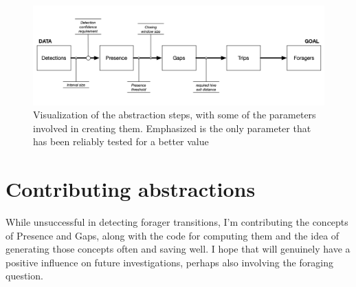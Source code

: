 \begin{figure}[htbp!] 
\centering    
\includegraphics[width=1.0\textwidth]{funnel-params}
\caption[funnel-params]{Visualization of the abstraction steps, with some of the parameters involved in creating them. Emphasized is the only parameter that has been reliably tested for a better value}
\label{fig:funnel-params}
\end{figure}




\section{Contributing abstractions}

While unsuccessful in detecting forager transitions, I'm contributing the concepts of Presence and Gaps, along with the code for computing them and the idea of generating those concepts often and saving well. I hope that will genuinely have a positive influence on future investigations, perhaps also involving the foraging question.

